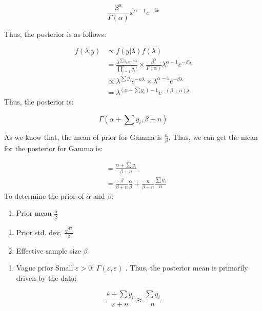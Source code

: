 \documentclass[
]{book}
\providecommand{\tightlist}{%
  \setlength{\itemsep}{0pt}\setlength{\parskip}{0pt}}
\begin{document}
\[\frac{\beta^{\alpha}}{\Gamma(\alpha)}x^{\alpha-1}e^{-\beta x}\]

Thus, the posterior is as follows:

\[\begin{aligned} f(\lambda | y) &\propto f(y|\lambda)f(\lambda) \\ &=\frac{\lambda^{\sum y_i} e^{- n \lambda}}{\prod_{i=1}^n y_i !} \times \frac{\beta^{\alpha}}{\Gamma(\alpha)}\lambda^{\alpha-1}e^{-\beta \lambda} \\ &\propto \lambda^{\sum y_i}e^{- n \lambda} \times \lambda^{\alpha-1}e^{-\beta \lambda} \\ &=\lambda^{(\alpha+\sum y_i)-1}e^{- (\beta+n) \lambda} \end{aligned}\]
Thus, the posterior is:

\[\Gamma(\alpha + \sum y_i, \beta+n)\]

As we know that, the mean of prior for Gamma is \(\frac{\alpha}{\beta}\). Thus, we can get the mean for the posterior for Gamma is:

\[\begin{aligned} &=\frac{\alpha+\sum y_i}{\beta+n} \\ &= \frac{\beta}{\beta+n} \frac{\alpha}{\beta}+\frac{n}{\beta+n} \frac{\sum y_i}{n} \end{aligned}\]
To determine the prior of \(\alpha\) and \(\beta\):

\begin{enumerate}
\def\labelenumi{(\arabic{enumi})}
\tightlist
\item
  Prior mean \(\frac{\alpha}{\beta}\)
\end{enumerate}

\begin{enumerate}
\def\labelenumi{(\alph{enumi})}
\tightlist
\item
  Prior std. dev. \(\frac{\sqrt \alpha}{\beta}\)
\item
  Effective sample size \(\beta\)
\end{enumerate}

\begin{enumerate}
\def\labelenumi{(\arabic{enumi})}
\setcounter{enumi}{1}
\tightlist
\item
  Vague prior
  Small \(\varepsilon >0\): \(\Gamma (\varepsilon,\varepsilon)\) . Thus, the posterior mean is primarily driven by the data:
\end{enumerate}

\[\frac{\varepsilon + \sum y_i}{\varepsilon + n} \approx \frac{ \sum y_i}{n} \]
\end{document}
